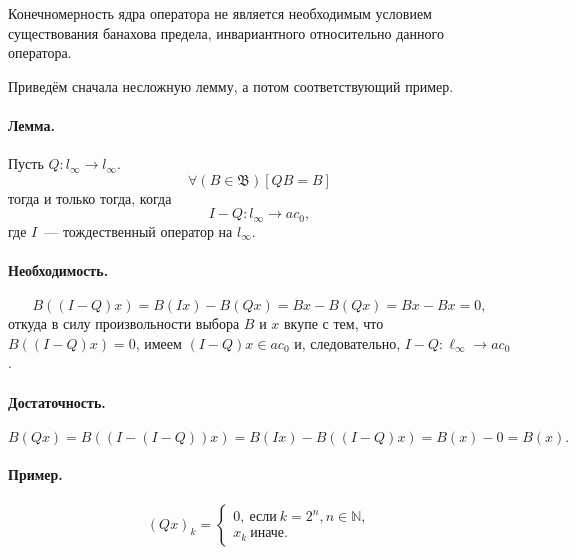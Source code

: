 Конечномерность ядра оператора не является необходимым условием существования
банахова предела, инвариантного относительно данного оператора.

Приведём сначала несложную лемму, а потом соответствующий пример.

\paragraph{Лемма.}

Пусть $Q:l_\infty \to l_\infty$.
\begin{equation}
	\forall(B\in\mathfrak{B})[QB = B]
\end{equation}
тогда и только тогда, когда
\begin{equation}\label{I-Q_to_ac_0}
	I-Q : l_\infty \to ac_0,
\end{equation}
где $I$~--- тождественный оператор на $l_\infty$.

\paragraph{Необходимость.}
\begin{equation}
	B((I-Q)x) =
	B(Ix) - B(Qx) =
	Bx - B(Qx)=
	Bx-Bx
	=
	0
	,
\end{equation}
откуда в силу произвольности выбора $B$ и $x$ вкупе с тем, что $B((I-Q)x)=0$,
имеем $(I-Q)x \in ac_0$ и, следовательно, $I-Q : \ell_\infty \to ac_0$.

\paragraph{Достаточность.}
\begin{equation}
	B(Qx) = B((I-(I-Q))x) =
	B(Ix)-B((I-Q)x) =
	B(x) - 0 = B(x).
\end{equation}


\paragraph{Пример.}

\begin{equation}
	(Qx)_k =
	\begin{cases}
		0,~\mbox{если}~ k = 2^n, n \in\mathbb{N},
		\\
		x_k~\mbox{иначе.}
	\end{cases}
\end{equation}

